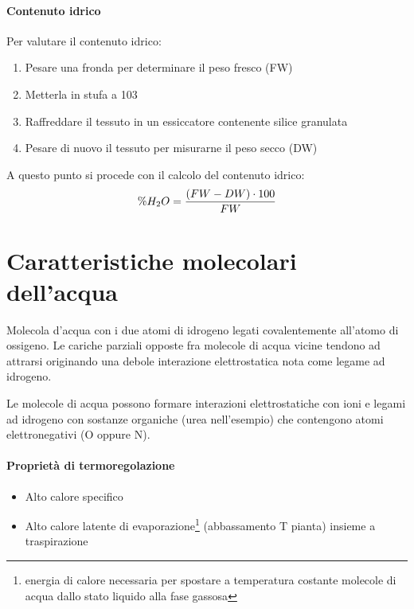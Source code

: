 \documentclass[a4paper,12pt]{book}
\begin{document}
\paragraph{Contenuto idrico}
Per valutare il contenuto idrico:
\begin{enumerate}
\item{Pesare una fronda per determinare il peso fresco (FW)}
\item{Metterla in stufa a 103 \textcelsius}
\item{Raffreddare il tessuto in un essiccatore contenente silice granulata}
\item{Pesare di nuovo il tessuto per misurarne il peso secco (DW)} 
\end{enumerate}
A questo punto si procede con il calcolo del contenuto idrico:
\begin{equation*}
\centering
	\% H_{2}O=\frac{(FW-DW) \cdot 100}{FW}
\end{equation*}

\section{Caratteristiche molecolari dell'acqua}


Molecola d’acqua con i due atomi di idrogeno legati covalentemente all’atomo di ossigeno. Le cariche parziali opposte fra molecole di acqua vicine tendono ad attrarsi originando una debole interazione elettrostatica nota come legame ad idrogeno.

Le molecole di acqua possono formare interazioni elettrostatiche con ioni e legami ad idrogeno
con sostanze organiche (urea nell’esempio) che contengono atomi elettronegativi (O oppure
N).

\paragraph{Proprietà di termoregolazione}

\begin{itemize}
\item{Alto calore specifico}
\item{Alto calore latente di evaporazione\footnote{energia di calore necessaria per spostare a temperatura costante molecole di acqua dallo stato liquido alla fase gassosa} (abbassamento T pianta) insieme a traspirazione}
\end{itemize}
\end{document}
